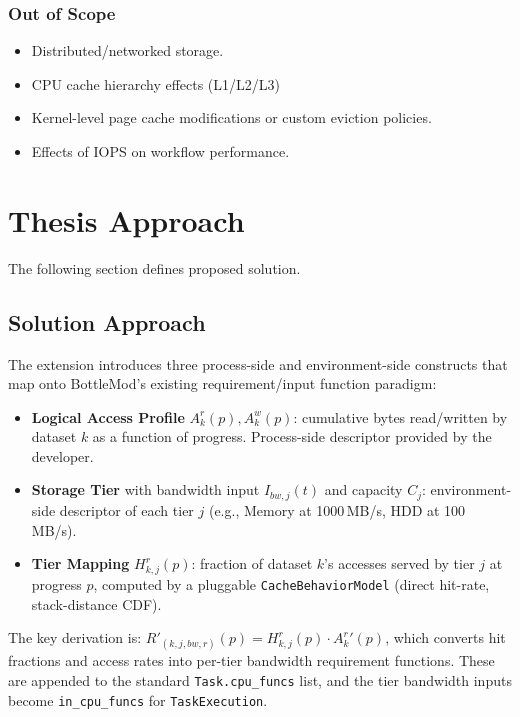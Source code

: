 \documentclass[11pt,a4paper]{article}
\begin{document}
\subsubsection{Out of Scope}
\begin{itemize}[nosep]
	\item Distributed/networked storage.
	\item CPU cache hierarchy effects (L1/L2/L3)
	\item Kernel-level page cache modifications or custom eviction policies.
	\item Effects of IOPS on workflow performance.
\end{itemize}

\section{Thesis Approach}
The following section defines proposed solution.

\subsection{Solution Approach}
The extension introduces three process-side and environment-side constructs that map onto BottleMod's existing requirement/input function paradigm:

\begin{itemize}[nosep]
	\item \textbf{Logical Access Profile} $A_k^r(p), A_k^w(p)$: cumulative bytes read/written by dataset $k$ as a function of progress. Process-side descriptor provided by the developer.
	\item \textbf{Storage Tier} with bandwidth input $I_{bw,j}(t)$ and capacity $C_j$: environment-side descriptor of each tier $j$ (e.g., Memory at 1000\,MB/s, HDD at 100\,MB/s).
	\item \textbf{Tier Mapping} $H_{k,j}^r(p)$: fraction of dataset $k$'s accesses served by tier $j$ at progress $p$, computed by a pluggable \texttt{CacheBehaviorModel} (direct hit-rate, stack-distance CDF).
\end{itemize}

The key derivation is: $R'_{(k,j,bw,r)}(p) = H_{k,j}^r(p) \cdot {A_k^r}'(p)$, which converts hit fractions and access rates into per-tier bandwidth requirement functions.
These are appended to the standard \texttt{Task.cpu\_funcs} list, and the tier bandwidth inputs become \texttt{in\_cpu\_funcs} for \texttt{TaskExecution}.
\end{document}
